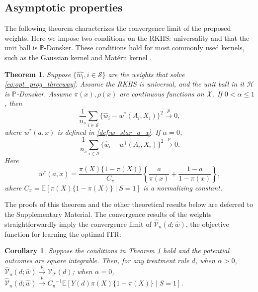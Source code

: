 \documentclass[12pt]{article}
\newtheorem{theorem}{Theorem}
\newtheorem{corollary}{Corollary}[theorem]
\newcommand{\E}{\mathbb{E}}
\newcommand{\prob}{\mathbb{P}}
\begin{document}
\subsection{Asymptotic properties}
\label{sec:method_weight_limit}

The following theorem characterizes the convergence limit of the proposed weights. Here we impose two conditions on the RKHS: universality and that the unit ball is $\prob$-Donsker. These conditions hold for most commonly used kernels, such as the Gaussian kernel and Mat\'ern kernel \citep{sriperumbudur2016optimal}. 

\begin{theorem}
    \label{thm:weight_limit}
    Suppose $\{\hat{w_i}, i \in \mathcal{S}\}$ are the weights that solve \eqref{eq:opt_prog_threeway}. Assume the RKHS is universal, and the unit ball in it $\mathcal{H}$ is $\prob$-Donsker. Assume $\pi(x), \rho(x)$ are continuous functions on $\mathcal{X}$.
    If $0 < \alpha \le 1$, then
    \begin{equation*}
        \frac{1}{n_s} \sum_{i \in \mathcal{S}}\big \{ \hat{w}_i - w^*(A_i, X_i) \big \}^2 \overset{p}{\longrightarrow} 0
    ,\end{equation*}
    where $w^*(a, x)$ is defined in \eqref{def:w_star_a_x}.
    If $\alpha = 0$,
    \begin{equation*}
        \frac{1}{n_s} \sum_{i \in \mathcal{S}} \big \{ \hat{w}_i - w^\dagger(A_i, X_i) \big \}^2 \overset{p}{\longrightarrow} 0
    .\end{equation*}
    Here $$w^\dagger(a, x) = \frac{\pi(X) \{ 1-\pi(X) \} }{C_\pi} \left\{ \frac{ a}{\pi(x)} + \frac{1-a}{1-\pi(x)} \right\},$$ where $C_\pi = \E[\pi(X) \{ 1-\pi(X) \} \mid S = 1]$ is a normalizing constant.
\end{theorem}

The proofs of this theorem and the other theoretical results below are deferred to the Supplementary Material. The convergence results of the weights straightforwardly imply the convergence limit of $\widehat{\mathcal{V}}_n(d; \hat{w})$, the objective function for learning the optimal ITR:
\begin{corollary}
	\label{thm:vndw_limit}
	Suppose the conditions in Theorem \ref{thm:weight_limit} hold and the potential outcomes are square integrable. Then, for any treatment rule $d$, when $\alpha > 0$, 
	$\widehat{\mathcal{V}}_n(d; \hat{w}) \overset{p}{\longrightarrow} \mathcal{V}_\mathcal{T}(d)$; when $\alpha = 0$, 
	$\widehat{\mathcal{V}}_n(d; \hat{w}) \overset{p}{\longrightarrow} {C_\pi}^{-1} \E[Y(d) \pi(X) \{ 1-\pi(X) \} \mid S=1]$.
\end{corollary}
\end{document}
